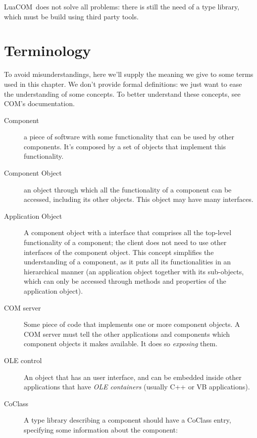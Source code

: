 \documentclass[11pt,a4paper,english]{report}
\newcommand{\techname}[1]{\mbox{#1}}
\newcommand{\luacom}{\techname{LuaCOM}}
\begin{document}
\luacom\ does not solve all problems: there is still the need of a
type library, which must be build using third party tools.


\section{Terminology}

To avoid misunderstandings, here we'll supply the meaning we give to
some terms used in this chapter. We don't provide formal definitions:
we just want to ease the understanding of some concepts. To better
understand these concepts, see COM's documentation.

\begin{description}

\item [Component] a piece of software with some functionality that can
be used by other components. It's composed by a set of objects that
implement this functionality.

\item [Component Object] an object through which all the functionality
of a component can be accessed, including its other objects. This
object may have many interfaces.

\item [Application Object] A component object with a interface that
comprises all the top-level functionality of a component; the client
does not need to use other interfaces of the component object. This
concept simplifies the understanding of a component, as it puts all
its functionalities in an hierarchical manner (an application object
together with its sub-objects, which can only be accessed through
methods and properties of the application object).

\item [COM server] Some piece of code that implements one or more
component objects. A COM server must tell the other applications and
components which component objects it makes available. It does so
\emph{exposing} them.

\item[OLE control] An object that has an user interface, and can be
embedded inside other applications that have \emph{OLE containers}
(usually C++ or VB applications).

\item [CoClass] A type library describing a component should have a
CoClass entry, specifying some information about the component:

  \begin{itemize}


\end{itemize}
\end{description}
\end{document}
